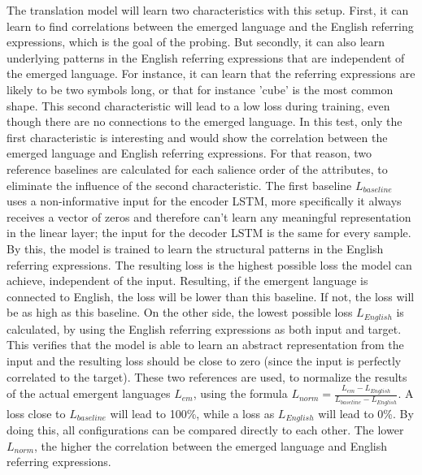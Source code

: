 The translation model will learn two characteristics with this setup.
First, it can learn to find correlations between the emerged language and the English referring expressions, which is the goal of the probing.
But secondly, it can also learn underlying patterns in the English referring expressions that are independent of the emerged language.
For instance, it can learn that the referring expressions are likely to be two symbols long, or that for instance 'cube' is the most common shape.
This second characteristic will lead to a low loss during training, even though there are no connections to the emerged language.
In this test, only the first characteristic is interesting and would show the correlation between the emerged language and English referring expressions.
For that reason, two reference baselines are calculated for each salience order of the attributes, to eliminate the influence of the second characteristic.
The first baseline $L_{baseline}$ uses a non-informative input for the encoder LSTM, more specifically it always receives a vector of zeros and therefore can't learn any meaningful representation in the linear layer; the input for the decoder LSTM is the same for every sample.
By this, the model is trained to learn the structural patterns in the English referring expressions.
The resulting loss is the highest possible loss the model can achieve, independent of the input.
Resulting, if the emergent language is connected to English, the loss will be lower than this baseline.
If not, the loss will be as high as this baseline.
On the other side, the lowest possible loss $L_{English}$ is calculated, by using the English referring expressions as both input and target.
This verifies that the model is able to learn an abstract representation from the input and the resulting loss should be close to zero (since the input is perfectly correlated to the target).
These two references are used, to normalize the results of the actual emergent languages $L_{em}$, using the formula $L_{norm} = \frac{L_{em}-L_{English}}{L_{baseline} - L_{English}}$.
A loss close to $L_{baseline}$ will lead to 100\%, while a loss as $L_{English}$ will lead to 0\%.
By doing this, all configurations can be compared directly to each other.
The lower $L_{norm}$, the higher the correlation between the emerged language and English referring expressions.

